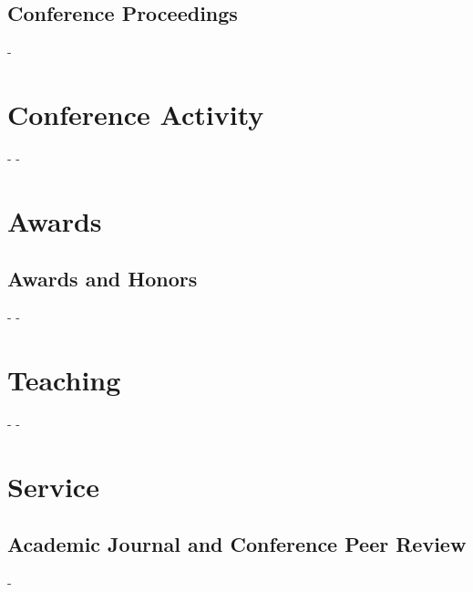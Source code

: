 \documentclass[12pt,letterpaper]{report}
\newcommand{\listitemspace}{0.25em}
\renewenvironment{itemize}
{\begin{list}{}{\setlength{\leftmargin}{0em}
                \setlength{\parskip}{0em}
                \setlength{\itemsep}{\listitemspace}
                \setlength{\parsep}{\listitemspace}}}
{\end{list}}
\begin{document}
    \subsection*{Conference Proceedings}
    \begin{tablist}
        \item[-] \tab{}\fullcite{-}
    \end{tablist}


    \section*{Conference Activity}
    \begin{tablist}
        \item[-] \tab{}-
    \end{tablist}

    \section*{Awards}
    \subsection*{Awards and Honors}
    \begin{tablist}
        \item[-] \tab{}-
    \end{tablist}

    \section*{Teaching}
    \begin{tablist}
        \item[-] \tab{}-
    \end{tablist}

    \section*{Service}
    \subsection*{Academic Journal and Conference Peer Review}
    \begin{itemize}
        \item -
    \end{itemize}
\end{document}
